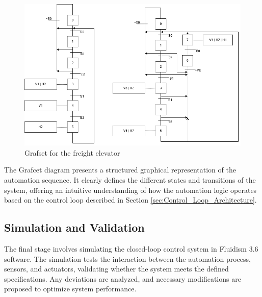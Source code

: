 \begin{figure}[H]
    \includegraphics[width=16cm]{Images/Q4/graftset.png}
    \centering
    \caption{Grafset for the freight elevator}
    \label{fig:grafset}
\end{figure}

The Grafcet diagram presents a structured graphical representation of the automation sequence. It clearly defines 
the different states and transitions of the system, offering an intuitive 
understanding of how the automation logic operates based on the control loop described in Section \ref{sec:Control_Loop_Architecture}.

\subsection{Simulation and Validation} \label{sec:Simulation_and_Validation}

The final stage involves simulating the closed-loop control system in Fluidism 3.6 software. 
The simulation tests the interaction between the automation process, sensors, and actuators, 
validating whether the system meets the defined specifications. Any deviations are analyzed, 
and necessary modifications are proposed to optimize system performance.


